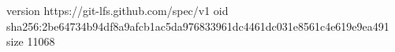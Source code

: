 version https://git-lfs.github.com/spec/v1
oid sha256:2be64734b94df8a9afcb1ac5da976833961dc4461dc031e8561c4e619e9ea491
size 11068
